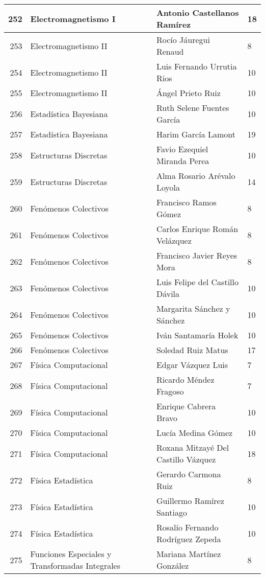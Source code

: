 \begin{table}[ht]
\begin{tabular}{rlll}
  252 & Electromagnetismo I & Antonio Castellanos Ramírez & 18 \\ \hline
  253 & Electromagnetismo II & Rocío Jáuregui Renaud & 8 \\ \hline
  254 & Electromagnetismo II & Luis Fernando Urrutia Rios & 10 \\ \hline
  255 & Electromagnetismo II & Ángel Prieto Ruiz & 10 \\ \hline
  256 & Estadística Bayesiana & Ruth Selene Fuentes García & 10 \\ \hline
  257 & Estadística Bayesiana & Harim García Lamont & 19 \\ \hline
  258 & Estructuras Discretas & Favio Ezequiel Miranda Perea & 10 \\ \hline
  259 & Estructuras Discretas & Alma Rosario Arévalo Loyola & 14 \\ \hline
  260 & Fenómenos Colectivos & Francisco Ramos Gómez & 8 \\ \hline
  261 & Fenómenos Colectivos & Carlos Enrique Román Velázquez & 8 \\ \hline
  262 & Fenómenos Colectivos & Francisco Javier Reyes Mora & 8 \\ \hline
  263 & Fenómenos Colectivos & Luis Felipe del Castillo Dávila & 10 \\ \hline
  264 & Fenómenos Colectivos & Margarita Sánchez y Sánchez & 10 \\ \hline
  265 & Fenómenos Colectivos & Iván Santamaría Holek & 10 \\ \hline
  266 & Fenómenos Colectivos & Soledad Ruiz Matus & 17 \\ \hline
  267 & Física Computacional & Edgar Vázquez Luis & 7 \\ \hline
  268 & Física Computacional & Ricardo Méndez Fragoso & 7 \\ \hline
  269 & Física Computacional & Enrique Cabrera Bravo & 10 \\ \hline
  270 & Física Computacional & Lucía Medina Gómez & 10 \\ \hline
  271 & Física Computacional & Roxana Mitzayé Del Castillo Vázquez & 18 \\ \hline
  272 & Física Estadística & Gerardo Carmona Ruiz & 8 \\ \hline
  273 & Física Estadística & Guillermo Ramírez Santiago & 10 \\ \hline
  274 & Física Estadística & Rosalío Fernando Rodríguez Zepeda & 10 \\ \hline
  275 & Funciones Especiales y Transformadas Integrales & Mariana Martínez González & 8 \\ \hline

\end{tabular}
\end{table}
